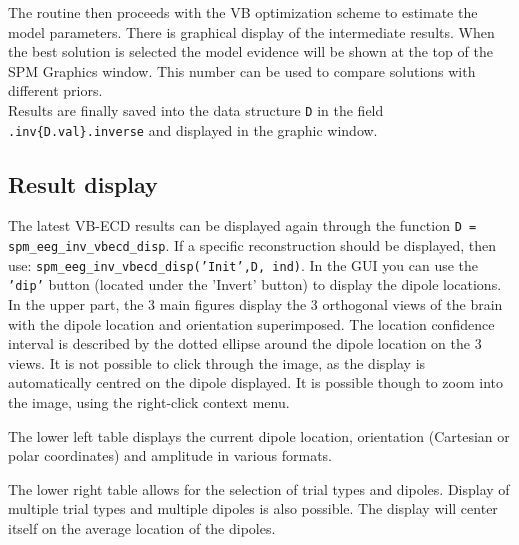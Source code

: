 The routine then proceeds with the VB optimization scheme to estimate the model parameters. There is graphical display of the intermediate results. When the best solution is selected the model evidence will be shown at the top of the SPM Graphics window. This number can be used to compare solutions with different priors.
\\
Results are finally saved into the data structure \texttt{D} in the field \texttt{.inv\{D.val\}.inverse} and displayed in the graphic window.

\subsection{Result display}

The latest VB-ECD results can be displayed again through the function \texttt{D = spm\_eeg\_inv\_vbecd\_disp}. If a specific reconstruction should be displayed, then use: \texttt{spm\_eeg\_inv\_vbecd\_disp('Init',D, ind)}. In the GUI you can use the \texttt{'dip'} button (located under the 'Invert' button) to display the dipole locations.
\\
In the upper part, the 3 main figures display the 3 orthogonal views of the brain with the dipole location and orientation superimposed. The location confidence interval is described by the dotted ellipse around the dipole location on the 3 views. It is not possible to click through the image, as the display is automatically centred on the dipole displayed. It is possible though to zoom into the image, using the right-click context menu.

The lower left table displays the current dipole location, orientation (Cartesian or polar coordinates) and amplitude in various formats.

The lower right table allows for the selection of trial types and dipoles. Display of multiple trial types and multiple dipoles is also possible. The display will center itself on the average location of the dipoles.





